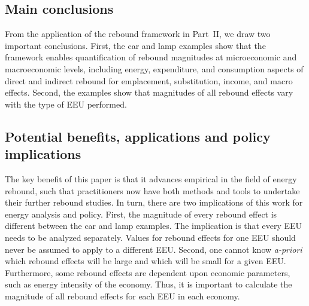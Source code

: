\documentclass[12pt]{article}    %
\begin{document}
\subsection*{Main conclusions}
\label{sec:conclusions}

From the application of the rebound framework in Part~II, 
we draw two important conclusions.
First, the car and lamp examples show that
        the framework enables
        quantification of rebound magnitudes at microeconomic and macroeconomic levels, including 
        energy, expenditure, and consumption aspects of 
        direct and indirect rebound 
        for emplacement, substitution, income, and macro effects.
Second, the examples show that magnitudes of all rebound effects
        vary with the type of EEU performed.


\subsection*{Potential benefits, applications and policy implications}
\label{sec:benefits}

The key benefit of this paper is that it advances empirical in the field of energy rebound,
such that practitioners now have both methods and tools
to undertake their further rebound studies. 
In turn, there are two implications of this work for energy analysis and policy.
First,
the magnitude of every rebound effect is different between the car and lamp examples.
The implication is that every EEU needs to be analyzed separately. 
Values for rebound effects  
for one EEU should never be assumed to apply to a different EEU.
Second, 
one cannot know \emph{a-priori} which rebound effects
will be large and which will be small
for a given EEU.
Furthermore, some rebound effects are dependent upon economic parameters,
such as energy intensity of the economy.
Thus, it is important to calculate the magnitude of all rebound effects 
for each EEU in each economy.
\end{document}
